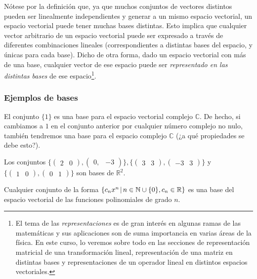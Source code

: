 \documentclass[12pt,dvipsnames]{article}
\begin{document}
Nótese por la definición que, ya que muchos conjuntos de vectores distintos pueden ser linealmente independientes y generar a un mismo espacio vectorial, un espacio vectorial puede tener muchas bases distintas. Esto implica que cualquier vector arbitrario de un espacio vectorial puede ser expresado a través de diferentes combinaciones lineales (correspondientes a distintas bases del espacio, y únicas para cada base). Dicho de otra forma, dado un espacio vectorial con más de una base, cualquier vector de ese espacio puede ser \emph{representado en las distintas bases} de ese espacio\footnote{El tema de las \emph{representaciones} es de gran interés en algunas ramas de las matemáticas y sus aplicaciones son de suma importancia en varias áreas de la física. En este curso, lo veremos sobre todo en las secciones de representación matricial de una transformación lineal, representación de una matriz en distintas bases y representaciones de un operador lineal en distintos espacios vectoriales.}.

\subsubsection{Ejemplos de bases} \label{Ejem:Bases}

El conjunto $\{1\}$ es una base para el espacio vectorial complejo $\mathbb{C}.$ De hecho, si cambiamos a $1$ en el conjunto anterior por cualquier número complejo no nulo, también tendremos una base para el espacio complejo $\mathbb{C}$ (¿a qué propiedades se debe esto?). 
\vspace{3mm}

Los conjuntos $\{\begin{pmatrix} 2 & 0 \end{pmatrix}, \begin{pmatrix} 0, & -3 \end{pmatrix}\}, \{\begin{pmatrix} 3 & 3 \end{pmatrix}, \begin{pmatrix} -3 & 3 \end{pmatrix}\}$ y $\{\begin{pmatrix} 1 & 0 \end{pmatrix},\begin{pmatrix} 0 & 1 \end{pmatrix}\}$ son bases de $\mathbb{R}^2$.
\vspace{3mm}

Cualquier conjunto de la forma $\{c_n x^n\hspace{0.5mm}|\hspace{0.5mm}n\in\mathbb{N}\cup\{0\}, c_n\in \mathbb{R}\}$ es una base del espacio vectorial de las funciones polinomiales de grado $n$.
\end{document}
